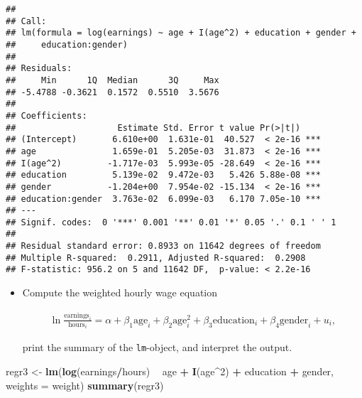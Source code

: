 \documentclass[]{article}
\newenvironment{Shaded}{\begin{snugshade}}{\end{snugshade}}
\newcommand{\KeywordTok}[1]{\textcolor[rgb]{0.13,0.29,0.53}{\textbf{#1}}}
\newcommand{\DataTypeTok}[1]{\textcolor[rgb]{0.13,0.29,0.53}{#1}}
\newcommand{\DecValTok}[1]{\textcolor[rgb]{0.00,0.00,0.81}{#1}}
\newcommand{\StringTok}[1]{\textcolor[rgb]{0.31,0.60,0.02}{#1}}
\newcommand{\OperatorTok}[1]{\textcolor[rgb]{0.81,0.36,0.00}{\textbf{#1}}}
\newcommand{\NormalTok}[1]{#1}
\providecommand{\tightlist}{%
  \setlength{\itemsep}{0pt}\setlength{\parskip}{0pt}}
\begin{document}
\begin{verbatim}
## 
## Call:
## lm(formula = log(earnings) ~ age + I(age^2) + education + gender + 
##     education:gender)
## 
## Residuals:
##     Min      1Q  Median      3Q     Max 
## -5.4788 -0.3621  0.1572  0.5510  3.5676 
## 
## Coefficients:
##                    Estimate Std. Error t value Pr(>|t|)    
## (Intercept)       6.610e+00  1.631e-01  40.527  < 2e-16 ***
## age               1.659e-01  5.205e-03  31.873  < 2e-16 ***
## I(age^2)         -1.717e-03  5.993e-05 -28.649  < 2e-16 ***
## education         5.139e-02  9.472e-03   5.426 5.88e-08 ***
## gender           -1.204e+00  7.954e-02 -15.134  < 2e-16 ***
## education:gender  3.763e-02  6.099e-03   6.170 7.05e-10 ***
## ---
## Signif. codes:  0 '***' 0.001 '**' 0.01 '*' 0.05 '.' 0.1 ' ' 1
## 
## Residual standard error: 0.8933 on 11642 degrees of freedom
## Multiple R-squared:  0.2911, Adjusted R-squared:  0.2908 
## F-statistic: 956.2 on 5 and 11642 DF,  p-value: < 2.2e-16
\end{verbatim}

\begin{itemize}
\tightlist
\item
  Compute the weighted hourly wage equation

  \begin{align*}
  \ln \frac{\text{earnings}_{i}}{\text{hours}_{i}}=\alpha +\beta _{1}\text{age}_{i}+\beta _{2}\text{age}_{i}^{2}+\beta _{3}\text{education}_{i}+\beta _{4}\text{gender}_{i}+u_{i},
  \end{align*}

  print the summary of the \texttt{lm}-object, and interpret the output.
\end{itemize}

\begin{Shaded}
\begin{Highlighting}[]
\NormalTok{regr3 <-}\StringTok{ }\KeywordTok{lm}\NormalTok{(}\KeywordTok{log}\NormalTok{(earnings}\OperatorTok{/}\NormalTok{hours) }\OperatorTok{~}\StringTok{ }\NormalTok{age }\OperatorTok{+}\StringTok{ }\KeywordTok{I}\NormalTok{(age}\OperatorTok{^}\DecValTok{2}\NormalTok{) }\OperatorTok{+}\StringTok{ }\NormalTok{education }\OperatorTok{+}\StringTok{ }\NormalTok{gender, }\DataTypeTok{weights =}\NormalTok{ weight)}
\KeywordTok{summary}\NormalTok{(regr3)}
\end{Highlighting}
\end{Shaded}
\end{document}
